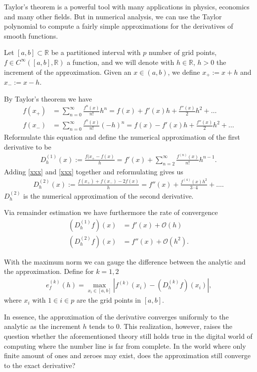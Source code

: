 Taylor's theorem is a powerful tool with many applications in physics, economics and many other fields. But in numerical analysis, we can use the Taylor polynomial to compute a fairly simple approximations for the derivatives of smooth functions.

Let \([a, b] \subset \mathbb{R}\) be a partitioned interval with \(p\) number of grid points, \(f \in C^{\infty}([a, b], \mathbb{R})\) a function, and we will denote with \(h \in \mathbb{R}\), \(h > 0\) the increment of the approximation. Given an \(x \in (a, b)\), we define \(x_{+} := x + h\) and \(x_{-} := x - h\).

By Taylor's theorem we have
\begin{align}
    f(x_{+}) &= \sum^{\infty}_{n = 0} \frac{f^{n}(x)}{n!} h^n = f(x) + f'(x)h + \frac{f''(x)}{2}h^2 + \dots \\
    f(x_{-}) &= \sum^{\infty}_{n = 0} \frac{f^{n}(x)}{n!} (-h)^n = f(x) - f'(x)h + \frac{f''(x)}{2}h^2 + \dots
\end{align}
Reformulate this equation and define the numerical approximation of the first derivative to be
\begin{align*}
    D^{(1)}_h (x) := \frac{f(x_{+} - f(x)}{h} = f'(x) + \sum^{\infty}_{n = 2} \frac{f^{(n)} (x)}{n!}h^{n-1} \text{.}
\end{align*}
Adding \ref{xxx} and \ref{xxx} together and reformulating gives us
\begin{align*}
    D^{(2)}_h (x) := \frac{f(x_{+}) + f(x_{-}) - 2f(x)}{h} = f''(x) + \frac{f^(4)(x)h^2}{3 \cdot 4} + \dots \text{.}
\end{align*}
\(D^{(2)}_h\) is the numerical approximation of the second derivative.

Via remainder estimation we have furthermore the rate of convergence
\begin{align*}
    (D^{(1)}_h f) (x) &= f'(x) + \mathcal{O}(h) \\
    (D^{(2)}_h f) (x) &= f''(x) + \mathcal{O}(h^2) \text{.}
\end{align*}

With the maximum norm we can gauge the difference between the analytic and the approximation. Define for \(k = 1, 2\)
\begin{align*}
    e^{(k)}_f (h) = \max_{x_i \in [a, b]} \left| f^{(k)} (x_i) - (D^{(k)}_h f) (x_i)\right| \text{,}
\end{align*}
where \(x_i\) with \(1 \in i \in p\) are the grid points in \([a, b]\).

In essence, the approximation of the derivative converges uniformly to the analytic as the increment \(h\) tends to \(0\). This realization, however, raises the question whether the aforementioned theory still holds true in the digital world of computing where the number line is far from complete. In the world where only finite amount of ones and zeroes may exist, does the approximation still converge to the exact derivative?\\